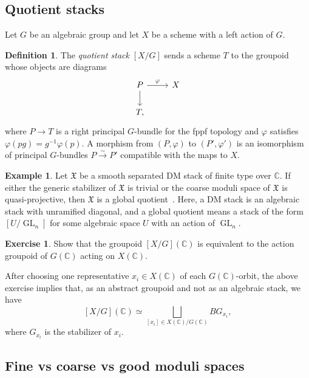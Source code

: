 \documentclass{amsart}
\theoremstyle{definition}
\newtheorem{defn}[thm]{Definition}
\newtheorem{exm}[thm]{Example}
\newtheorem{exer}[thm]{Exercise}
\theoremstyle{remark}
\theoremstyle{plain}
\theoremstyle{definition}
\theoremstyle{remark}
\newcommand{\C}{\mathbb{C}}
\newcommand{\mf}[1]{\mathfrak{#1}}
\newcommand{\on}[1]{\operatorname{#1}}
\newcommand{\1}{\mathbf{1}}
\newcommand{\2}{\mathbf{2}}
\newcommand{\3}{\mathbf{3}}
\begin{document}
\subsection{Quotient stacks}%
\label{sub:Quotient stacks}

Let \(G\) be an algebraic group and let \(X\) be a scheme with a left action of \(G\).

\begin{defn}
    The \textit{quotient stack} \([X/G]\) sends a scheme \(T\) to the groupoid whose objects are diagrams
    \begin{equation*}
    \begin{tikzcd}
        P \ar{r}{\varphi} \ar{d} & X \\
        T,
    \end{tikzcd}
    \end{equation*}
    where \(P\to T\) is a right principal \(G\)-bundle for the fppf topology and \(\varphi\) satisfies \(\varphi(pg)=g^{-1}\varphi(p)\). A morphism from \((P,\varphi)\) to \((P',\varphi')\) is an isomorphism of principal \(G\)-bundles \(P\xrightarrow{\sim}P'\) compatible with the maps to \(X\).
\end{defn}

\begin{exm}
    Let \(\mf{X}\) be a smooth separated DM stack of finite type over \(\C\). If either the generic stabilizer of \(\mf{X}\) is trivial or the coarse moduli space of \(\mf{X}\) is quasi-projective, then \(\mf{X}\) is a global quotient~\cite{EHKV2001}. Here, a DM stack is an algebraic stack with unramified diagonal, and a global quotient means a stack of the form \([U/\on{GL}_n]\) for some algebraic space \(U\) with an action of \(\on{GL}_n\).
\end{exm}

\begin{exer}
    Show that the groupoid \([X/G](\C)\) is equivalent to the action groupoid of \(G(\C)\) acting on \(X(\C)\).
\end{exer}

After choosing one representative \(x_i\in X(\C)\) of each \(G(\C)\)-orbit, the above exercise implies that, as an abstract groupoid and not as an algebraic stack, we have
\[ 
    [X/G](\C) \simeq \bigsqcup_{[x_i] \in X(\C)/G(\C)} BG_{x_i}, 
\]
where \(G_{x_i}\) is the stabilizer of \(x_i\).


\subsection{Fine vs coarse vs good moduli spaces}%
\label{sub:Fine vs coarse vs good moduli spaces}
\end{document}
